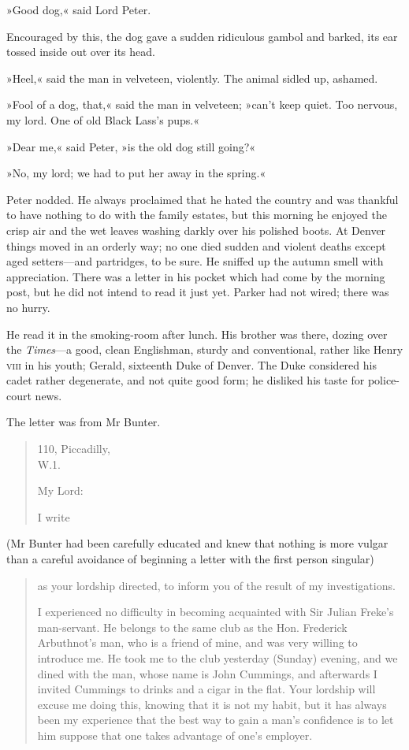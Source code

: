 »Good dog,« said Lord Peter.

Encouraged by this, the dog gave a sudden ridiculous gambol and barked, its ear tossed inside out over its head.

»Heel,« said the man in velveteen, violently. The animal sidled up, ashamed.

»Fool of a dog, that,« said the man in velveteen; »can't keep quiet. Too nervous, my lord. One of old Black Lass's pups.«

»Dear me,« said Peter, »is the old dog still going?«

»No, my lord; we had to put her away in the spring.«

Peter nodded. He always proclaimed that he hated the country and was thankful to have nothing to do with the family estates, but this morning he enjoyed the crisp air and the wet leaves washing darkly over his polished boots. At Denver things moved in an orderly way; no one died sudden and violent deaths except aged setters—and partridges, to be sure. He sniffed up the autumn smell with appreciation. There was a letter in his pocket which had come by the morning post, but he did not intend to read it just yet. Parker had not wired; there was no hurry.

He read it in the smoking-room after lunch. His brother was there, dozing over the \textit{Times}---a good, clean Englishman, sturdy and conventional, rather like Henry \textsc{viii} in his youth; Gerald, sixteenth Duke of Denver. The Duke considered his cadet rather degenerate, and not quite good form; he disliked his taste for police-court news.

The letter was from Mr Bunter.

\clearpage


\begin{quotation}
\begin{flushright}
110, Piccadilly,\\
W.1.
\end{flushright}

\noindent My Lord:

I write 
\end{quotation}

(Mr Bunter had been carefully educated and knew that nothing is more vulgar than a careful avoidance of beginning a letter with the first person singular) 

\begin{quotation}
as your lordship directed, to inform you of the result of my investigations.

I experienced no difficulty in becoming acquainted with Sir Julian Freke's man-servant. He belongs to the same club as the Hon. Frederick Arbuthnot's man, who is a friend of mine, and was very willing to introduce me. He took me to the club yesterday (Sunday) evening, and we dined with the man, whose name is John Cummings, and afterwards I invited Cummings to drinks and a cigar in the flat. Your lordship will excuse me doing this, knowing that it is not my habit, but it has always been my experience that the best way to gain a man's confidence is to let him suppose that one takes advantage of one's employer.
\end{quotation}

